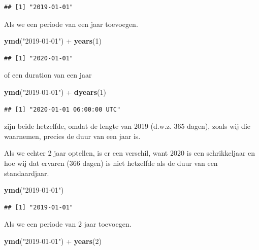 \documentclass[]{tufte-book}
\newenvironment{Shaded}{}{}
\newcommand{\DecValTok}[1]{\textcolor[rgb]{0.25,0.63,0.44}{#1}}
\newcommand{\KeywordTok}[1]{\textcolor[rgb]{0.00,0.44,0.13}{\textbf{#1}}}
\newcommand{\NormalTok}[1]{#1}
\newcommand{\OperatorTok}[1]{\textcolor[rgb]{0.40,0.40,0.40}{#1}}
\newcommand{\StringTok}[1]{\textcolor[rgb]{0.25,0.44,0.63}{#1}}
\begin{document}
\begin{verbatim}
## [1] "2019-01-01"
\end{verbatim}

Als we een periode van een jaar toevoegen.

\begin{Shaded}
\begin{Highlighting}[]
\KeywordTok{ymd}\NormalTok{(}\StringTok{"2019-01-01"}\NormalTok{) }\OperatorTok{+}\StringTok{ }\KeywordTok{years}\NormalTok{(}\DecValTok{1}\NormalTok{)}
\end{Highlighting}
\end{Shaded}

\begin{verbatim}
## [1] "2020-01-01"
\end{verbatim}

of een duration van een jaar

\begin{Shaded}
\begin{Highlighting}[]
\KeywordTok{ymd}\NormalTok{(}\StringTok{"2019-01-01"}\NormalTok{) }\OperatorTok{+}\StringTok{ }\KeywordTok{dyears}\NormalTok{(}\DecValTok{1}\NormalTok{)}
\end{Highlighting}
\end{Shaded}

\begin{verbatim}
## [1] "2020-01-01 06:00:00 UTC"
\end{verbatim}

zijn beide hetzelfde, omdat de lengte van 2019 (d.w.z. 365 dagen), zoals wij die waarnemen, precies de duur van een jaar is.

Als we echter 2 jaar optellen, is er een verschil, want 2020 is een schrikkeljaar en hoe wij dat ervaren (366 dagen) is niet hetzelfde als de duur van een standaardjaar.

\begin{Shaded}
\begin{Highlighting}[]
\KeywordTok{ymd}\NormalTok{(}\StringTok{"2019-01-01"}\NormalTok{)}
\end{Highlighting}
\end{Shaded}

\begin{verbatim}
## [1] "2019-01-01"
\end{verbatim}

Als we een periode van 2 jaar toevoegen.

\begin{Shaded}
\begin{Highlighting}[]
\KeywordTok{ymd}\NormalTok{(}\StringTok{"2019-01-01"}\NormalTok{) }\OperatorTok{+}\StringTok{ }\KeywordTok{years}\NormalTok{(}\DecValTok{2}\NormalTok{)}
\end{Highlighting}
\end{Shaded}
\end{document}
